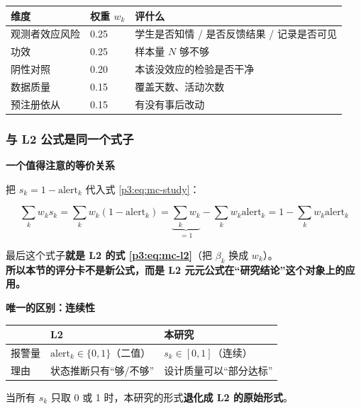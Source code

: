 \documentclass[UTF8,a4paper,11pt]{ctexart}
\newenvironment{explainbox}[1]
{\begin{center}\begin{minipage}{0.94\textwidth}\colorbox{boxbg}{\parbox{0.92\textwidth}{\textbf{#1}\par\vspace{2pt}}}}
{\end{minipage}\end{center}}
\begin{document}
\begin{center}
\begin{tabular}{p{4.2cm}p{1.8cm}p{8.2cm}}
\toprule
\textbf{维度} & \textbf{权重 $w_k$} & \textbf{评什么} \\
\midrule
观测者效应风险 & 0.25 & 学生是否知情 / 是否反馈结果 / 记录是否可见 \\
功效 & 0.25 & 样本量 $N$ 够不够 \\
阴性对照 & 0.20 & 本该没效应的检验是否干净 \\
数据质量 & 0.15 & 覆盖天数、活动次数 \\
预注册依从 & 0.15 & 有没有事后改动 \\
\bottomrule
\end{tabular}
\end{center}

\subsubsection{与 L2 公式是同一个式子}

\begin{explainbox}{一个值得注意的等价关系}
把 $s_k = 1 - \text{alert}_k$ 代入式 \eqref{p3:eq:mc-study}：

\begin{equation}
\sum_{k} w_k s_k
= \sum_{k} w_k (1 - \text{alert}_k)
= \underbrace{\sum_{k} w_k}_{=1} - \sum_{k} w_k \text{alert}_k
= 1 - \sum_{k} w_k \text{alert}_k
\end{equation}

最后这个式子\textbf{就是 L2 的式 \eqref{p3:eq:mc-l2}}（把 $\beta_k$ 换成 $w_k$）。\\[4pt]
\textbf{所以本节的评分卡不是新公式，而是 L2 元元公式在“研究结论”这个对象上的应用。}
\end{explainbox}

\begin{explainbox}{唯一的区别：连续性}
\begin{center}
\begin{tabular}{p{3.6cm}p{4.2cm}p{5.4cm}}
\toprule
 & \textbf{L2} & \textbf{本研究} \\
\midrule
报警量 & $\text{alert}_k \in \{0,1\}$（二值） & $s_k \in [0,1]$（连续） \\
理由 & 状态推断只有“够/不够” & 设计质量可以“部分达标” \\
\bottomrule
\end{tabular}
\end{center}
当所有 $s_k$ 只取 0 或 1 时，本研究的形式\textbf{退化成 L2 的原始形式}。
\end{explainbox}
\end{document}
